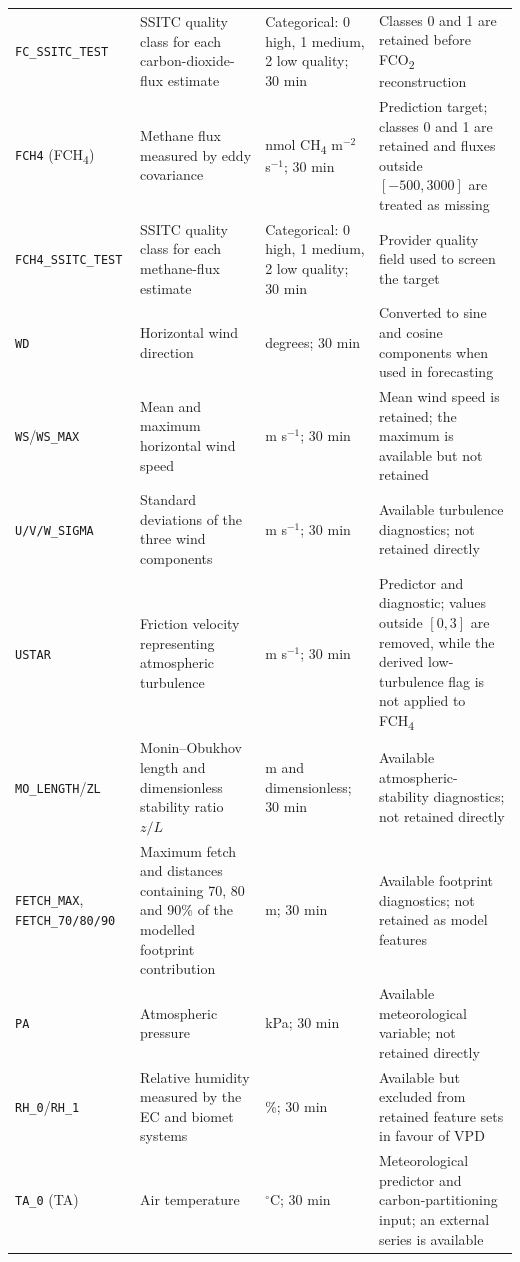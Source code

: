 {\begin{longtable}{p{2.7cm}p{4.5cm}p{2.5cm}p{4.8cm}}
\texttt{FC\_SSITC\_TEST} & SSITC quality class for each carbon-dioxide-flux estimate & Categorical: 0 high, 1 medium, 2 low quality; 30 min & Classes 0 and 1 are retained before FCO\textsubscript{2} reconstruction \\
\texttt{FCH4} (FCH\textsubscript{4}) & Methane flux measured by eddy covariance & nmol CH\textsubscript{4} m$^{-2}$ s$^{-1}$; 30 min & Prediction target; classes 0 and 1 are retained and fluxes outside $[-500,3000]$ are treated as missing \\
\texttt{FCH4\_SSITC\_TEST} & SSITC quality class for each methane-flux estimate & Categorical: 0 high, 1 medium, 2 low quality; 30 min & Provider quality field used to screen the target \\
\texttt{WD} & Horizontal wind direction & degrees; 30 min & Converted to sine and cosine components when used in forecasting \\
\texttt{WS}/\texttt{WS\_MAX} & Mean and maximum horizontal wind speed & m s$^{-1}$; 30 min & Mean wind speed is retained; the maximum is available but not retained \\
\texttt{U/V/W\_SIGMA} & Standard deviations of the three wind components & m s$^{-1}$; 30 min & Available turbulence diagnostics; not retained directly \\
\texttt{USTAR} & Friction velocity representing atmospheric turbulence & m s$^{-1}$; 30 min & Predictor and diagnostic; values outside $[0,3]$ are removed, while the derived low-turbulence flag is not applied to FCH\textsubscript{4} \\
\texttt{MO\_LENGTH}/\texttt{ZL} & Monin--Obukhov length and dimensionless stability ratio $z/L$ & m and dimensionless; 30 min & Available atmospheric-stability diagnostics; not retained directly \\
\texttt{FETCH\_MAX}, \texttt{FETCH\_70/80/90} & Maximum fetch and distances containing 70, 80 and 90\% of the modelled footprint contribution & m; 30 min & Available footprint diagnostics; not retained as model features \\
\texttt{PA} & Atmospheric pressure & kPa; 30 min & Available meteorological variable; not retained directly \\
\texttt{RH\_0}/\texttt{RH\_1} & Relative humidity measured by the EC and biomet systems & \%; 30 min & Available but excluded from retained feature sets in favour of VPD \\
\texttt{TA\_0} (TA) & Air temperature & $^{\circ}$C; 30 min & Meteorological predictor and carbon-partitioning input; an external series is available \\

\end{longtable}}
